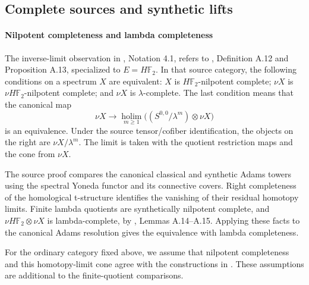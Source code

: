 \subsection{Complete sources and synthetic lifts}
\label{sem:Literature:lambda-completeness}

\paragraph*{Nilpotent completeness and lambda completeness}
The inverse-limit observation in \cite{LWX126}, Notation 4.1, refers to
\cite{BHS}, Definition A.12 and Proposition A.13, specialized to
$E=H\mathbb F_2$. In that source category, the following conditions
on a spectrum $X$ are equivalent: $X$ is $H\mathbb F_2$-nilpotent
complete; $\nu X$ is $\nu H\mathbb F_2$-nilpotent complete; and
$\nu X$ is $\lambda$-complete. The last condition means that the
canonical map
\[
\nu X\longrightarrow\operatorname*{holim}_{m\geq1}
       \bigl((S^{0,0}/\lambda^m)\otimes\nu X\bigr)
\]
is an equivalence. Under the source tensor/cofiber identification, the
objects on the right are $\nu X/\lambda^m$. The limit is taken with
the quotient restriction maps and the cone from $\nu X$.

The source proof compares the canonical classical and synthetic Adams
towers using the spectral Yoneda functor and its connective covers.
Right completeness of the homological t-structure identifies the
vanishing of their residual homotopy limits. Finite lambda quotients
are synthetically nilpotent complete, and
$\nu H\mathbb F_2\otimes\nu X$ is lambda-complete, by
\cite{BHS}, Lemmas A.14--A.15. Applying these facts to the canonical
Adams resolution gives the equivalence with lambda completeness.

For the ordinary category fixed above, we assume that nilpotent
completeness and this homotopy-limit cone agree with the constructions
in \cite{BHS}. These assumptions are additional to the finite-quotient
comparisons.

